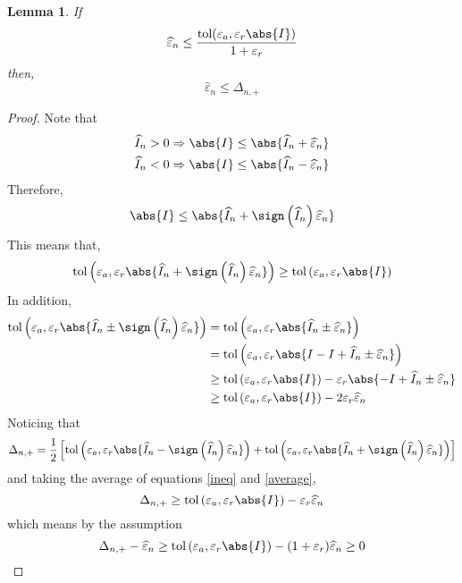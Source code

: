 \documentclass[]{elsarticle}
\newtheorem{lem}{Lemma}
\theoremstyle{definition}
\newcommand{\tol}{\text{tol}}
\begin{document}
\begin{lem}\label{second}
If
\[
\widehat{\varepsilon}_n\leq \frac{\tol(\varepsilon_a,\varepsilon_r\abs{I})}{1+\varepsilon_r}
\]
then,
\[
\widehat{\varepsilon}_n\leq \Delta_{n,+}
\]
\end{lem}
\begin{proof}
Note that
\begin{align*}
&\widehat{I}_n>0\Rightarrow\abs{I}\leq \abs{\widehat{I}_n+\widehat{\varepsilon}_n}\\
&\widehat{I}_n<0\Rightarrow\abs{I}\leq \abs{\widehat{I}_n-\widehat{\varepsilon}_n}
\end{align*}
Therefore,
\[
\abs{I}\leq \abs{\widehat{I}_n+\sign\left(\widehat{I}_n\right)\widehat{\varepsilon}_n}
\]
This means that,
\begin{equation}\label{ineq}
\tol\left(\varepsilon_a,\varepsilon_r\abs{\widehat{I}_n+\sign\left(\widehat{I}_n\right)\widehat{\varepsilon}_n}\right)\geq \tol\left(\varepsilon_a,\varepsilon_r\abs{I}\right)
\end{equation}
In addition,
\begin{align}
\tol\left(\varepsilon_a,\varepsilon_r\abs{\widehat{I}_n\pm\sign\left(\widehat{I}_n\right)\widehat{\varepsilon}_n}\right)&=\tol\left(\varepsilon_a,\varepsilon_r\abs{\widehat{I}_n\pm\widehat{\varepsilon}_n}\right)\\
& =\tol\left(\varepsilon_a,\varepsilon_r\abs{I-I+\widehat{I}_n\pm\widehat{\varepsilon}_n}\right)\\
& \geq \tol\left(\varepsilon_a,\varepsilon_r\abs{I}\right)-\varepsilon_r\abs{-I+\widehat{I}_n\pm\widehat{\varepsilon}_n} \\
& \geq \tol\left(\varepsilon_a,\varepsilon_r\abs{I}\right)-2\varepsilon_r\widehat{\varepsilon}_n \label{average}
\end{align}
Noticing that
\[
\Delta_{n,+}=\frac 1 2 \left[ \tol\left(\varepsilon_a,\varepsilon_r\abs{\widehat{I}_n-\sign\left(\widehat{I}_n\right)\widehat{\varepsilon}_n}\right) + \tol\left(\varepsilon_a,\varepsilon_r\abs{\widehat{I}_n+\sign\left(\widehat{I}_n\right)\widehat{\varepsilon}_n}\right) \right]
\]
and taking the average of equations \eqref{ineq} and \eqref{average},
\[
\Delta_{n,+}\geq \tol\left(\varepsilon_a,\varepsilon_r\abs{I}\right)-\varepsilon_r\widehat{\varepsilon}_n
\]
which means by the assumption
\[
\Delta_{n,+} - \widehat{\varepsilon}_n \geq \tol\left(\varepsilon_a,\varepsilon_r\abs{I}\right)-(1+\varepsilon_r)\widehat{\varepsilon}_n\geq 0
\]
\end{proof}
\end{document}
